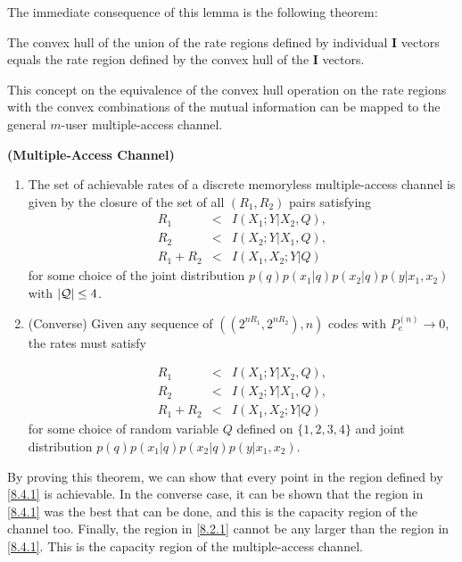 %
The immediate consequence of this lemma is the following theorem:
%
\begin{tcolorbox}[boxrule=0pt,frame hidden,sharp corners,enhanced, opacityback=0, borderline west={2pt}{0pt}{blue}]
\begin{thm} 
The convex hull of the union of the rate regions defined by individual $\mathbf{I}$ vectors equals the rate region defined by the convex hull of the $\mathbf{I}$ vectors.
\end{thm}
\end{tcolorbox}
%
This concept on the equivalence of the convex hull operation on the rate regions with the convex combinations of the mutual information can be mapped to the general $m$-user multiple-access channel.
%
\begin{tcolorbox}[boxrule=0pt,frame hidden,sharp corners,enhanced, opacityback=0, borderline west={2pt}{0pt}{blue}]
\begin{thm} 
\textbf{(Multiple-Access Channel)}
\begin{enumerate}
    \item The set of achievable rates of a discrete memoryless multiple-access channel is given by the closure of the set of all $(R_1, R_2)$ pairs satisfying
%
\begin{eqnarray}
    R_1 &<& I(X_1;Y|X_2,Q), \nonumber\\
    R_2 &<& I(X_2;Y|X_1,Q), \nonumber\\
    R_1+R_2 &<& I(X_1,X_2;Y|Q)
\end{eqnarray}
%
for some choice of the joint distribution $p(q)p(x_1|q)p(x_2|q)p(y|x_1,x_2)$ with $\abs{\mathcal{Q}}\leq 4$.

\item (Converse) Given any sequence of $((2^{nR_1},2^{nR_2}),n)$ codes with $P_e^{(n)} \rightarrow 0$, the rates must satisfy 

\begin{eqnarray}
    R_1 &<& I(X_1;Y|X_2,Q), \nonumber\\
    R_2 &<& I(X_2;Y|X_1,Q), \nonumber\\
    R_1+R_2 &<& I(X_1,X_2;Y|Q)
    \label{8.4.1}
\end{eqnarray}
%
for some choice of random variable $Q$ defined on $\{1,2,3,4 \}$ and joint distribution $p(q)p(x_1|q)p(x_2|q)p(y|x_1,x_2)$.
\end{enumerate}

\end{thm}
\end{tcolorbox}
%
By proving this theorem, we can show that every point in the region defined by \eqref{8.4.1} is achievable. In the converse case, it can be shown that the region in \eqref{8.4.1} was the best that can be done, and this is the capacity region of the channel too. Finally, the region in \eqref{8.2.1} cannot be any larger than the region in \eqref{8.4.1}. This is the capacity region of the multiple-access channel. 

